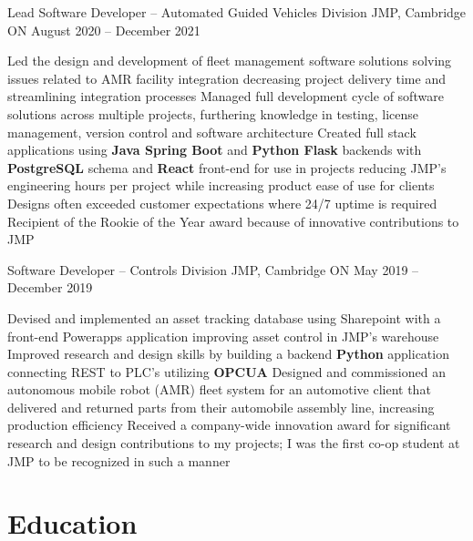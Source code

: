 \documentclass[a4paper,11pt]{article}
\begin{document}
\begin{subheading}
	\resumeExp
	{Lead Software Developer -- Automated Guided Vehicles Division}
	{JMP, Cambridge ON}
	{August 2020 -- December 2021}
	{}
	\begin{entries}
		\ib Led the design and development of fleet management software solutions solving issues related to
		AMR facility integration decreasing project delivery time and streamlining integration processes
		\ib  Managed full development cycle of software solutions across multiple projects, furthering
		knowledge in testing, license management, version control and software architecture
		\ib Created full stack applications using \textbf{Java Spring Boot} and \textbf{Python Flask} backends with
		\textbf{PostgreSQL} schema and \textbf{React} front-end for use in projects reducing JMP's engineering hours
		per project while increasing product ease of use for clients
		\ib Designs often exceeded customer expectations where 24/7 uptime is required
		\ib Recipient of the Rookie of the Year award because of innovative contributions to JMP
	\end{entries}

	\newpage
	\resumeExp
	{Software Developer -- Controls Division}
	{JMP, Cambridge ON}
	{May 2019 -- December 2019}
	{}
	\begin{entries}
		\ib Devised and implemented an asset tracking database using Sharepoint with a front-end
		Powerapps application improving asset control in JMP's warehouse
		\ib Improved research and design skills by building a backend \textbf{Python} application connecting REST
		to PLC's utilizing \textbf{OPCUA}
		\ib Designed and commissioned an autonomous mobile robot (AMR) fleet system for an automotive client that delivered and
		returned parts from their automobile assembly line, increasing production efficiency
		\ib Received a company-wide innovation award for significant research and design contributions to
		my projects; I was the first co-op student at JMP to be recognized in such a manner
	\end{entries}

\end{subheading}
\sectionsep
\section{Education}
\end{document}
